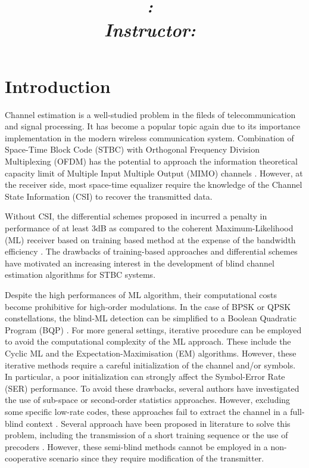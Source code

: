 \documentclass[letterpaper,10pt]{article}
\title{
    \vspace{2in}
    \textmd{\textbf{\projectname}}\\
    \normalsize\vspace{0.3in}\large{\textit{\hmwkClass:\ \hmwkTitle}}\\
    \vspace{0.1in}\large{\textit{Instructor:\ \hmwkClassInstructor}}
    \vspace{3in}
}
\author{\textbf{\hmwkAuthorName}}
\date{}
\begin{document}
\maketitle

\pagebreak

\section{Introduction}

Channel estimation is a well-studied problem in the fileds of telecommunication and signal processing. It has become a popular topic again due to its importance implementation in the modern wireless communication system. Combination of Space-Time Block Code (STBC) with Orthogonal Frequency Division Multiplexing (OFDM) has the potential to approach the information theoretical capacity limit of Multiple Input Multiple Output (MIMO) channels \cite{Ganesan:2001}. However, at the receiver side, most space-time equalizer require the knowledge of the Channel State Information (CSI) to recover the transmitted data.

Without CSI, the differential schemes proposed in \cite{Ganesan:2002, Zhu:2005} incurred a penalty in performance of at least 3dB as compared to the coherent Maximum-Likelihood (ML) receiver based on training based method at the expense of the bandwidth efficiency \cite{Larsson:2002, Larsson:2003}. The drawbacks of training-based approaches and differential schemes have motivated an increasing interest in the development of blind channel estimation algorithms for STBC systems. 

Despite the high performances of ML algorithm, their computational costs become prohibitive for high-order modulations. In the case of BPSK or QPSK constellations, the blind-ML detection can be simplified to a Boolean Quadratic Program (BQP) \cite{Ma:2006}. For more general settings, iterative procedure can be employed to avoid the computational complexity of the ML approach. These include the Cyclic ML \cite{Larsson:2003} and the Expectation-Maximisation (EM) \cite{Li:2001} algorithms. However, these iterative methods require a careful initialization of the channel and/or symbols. In particular, a poor initialization can strongly affect the Symbol-Error Rate (SER) performance. To avoid these drawbacks, several authors have investigated the use of sub-space \cite{Ammar:2007} or second-order statistics \cite{Shahbazpanahi:2005, Via:2008} approaches. However, excluding some specific low-rate codes, these approaches fail to extract the channel in a full-blind context \cite{Ammar:2007, Shahbazpanahi:2005, Via:2008}. Several approach have been proposed in literature to solve this problem, including the transmission of a short training sequence \cite{Ammar:2007} or the use of precoders \cite{Via:2008}. However, these semi-blind methods cannot be employed in a non-cooperative scenario since they require modification of the transmitter.
\end{document}
